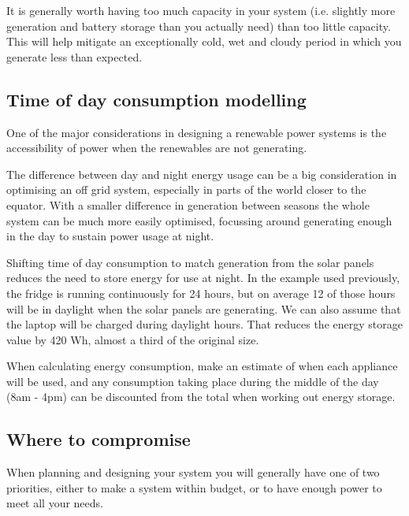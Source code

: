 \documentclass{article}
\theoremstyle{definition}
\theoremstyle{definition}
\theoremstyle{remark}
\begin{document}
    It is generally worth having too much capacity in your system (i.e. slightly more generation and battery storage than you actually need) than too little capacity. This will help mitigate an exceptionally cold, wet and cloudy period in which you generate less than expected. 
  

  {\color{blue}\subsection{Time of day consumption modelling}} %
  \label{sub:time_of_day_consumption_modelling}

    One of the major considerations in designing a renewable power systems is the accessibility of power when the renewables are not generating.

    The difference between day and night energy usage can be a big consideration in optimising an off grid system, especially in parts of the world closer to the equator. With a smaller difference in generation between seasons the whole system can be much more easily optimised, focussing around generating enough in the day to sustain power usage at night.

    Shifting time of day consumption to match generation from the solar panels reduces the need to store energy for use at night. In the example used previously, the fridge is running continuously for 24 hours, but on average 12 of those hours will be in daylight when the solar panels are generating. We can also assume that the laptop will be charged during daylight hours. That reduces the energy storage value by 420 Wh, almost a third of the original size. 

    When calculating energy consumption, make an estimate of when each appliance will be used, and any consumption taking place during the middle of the day (8am - 4pm) can be discounted from the total when working out energy storage.
  

  {\color{blue}\subsection{Where to compromise}} %
  \label{sub:where_to_compromise}

    When planning and designing your system you will generally have one of two priorities, either to make a system within budget, or to have enough power to meet all your needs.
\end{document}
